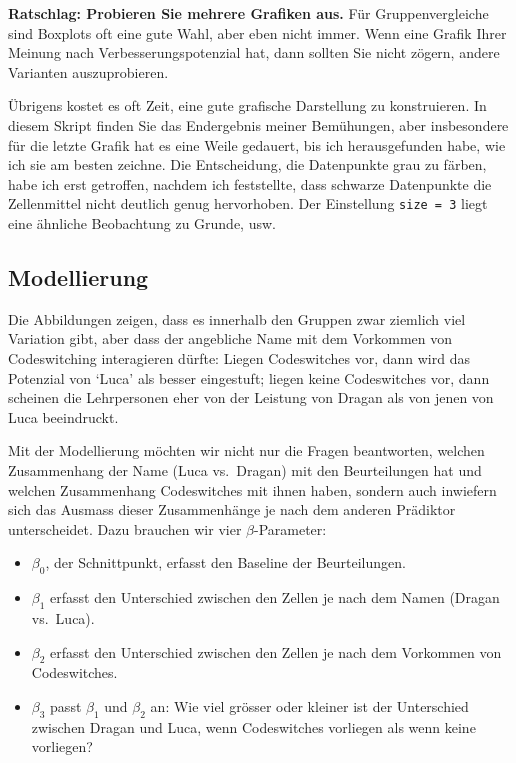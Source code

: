 \documentclass[oneside, 10pt]{book}\usepackage[]{graphicx}\usepackage[]{xcolor}
\begin{document}
\medskip

\begin{framed}
\noindent \textbf{Ratschlag: Probieren Sie mehrere Grafiken aus.} Für
Gruppenvergleiche sind Boxplots oft eine gute Wahl,
aber eben nicht immer. Wenn eine Grafik Ihrer Meinung
nach Verbesserungspotenzial hat, dann sollten Sie nicht
zögern, andere Varianten auszuprobieren.

Übrigens kostet es oft Zeit, eine gute grafische
Darstellung zu konstruieren. In diesem Skript finden
Sie das Endergebnis meiner Bemühungen, aber
insbesondere für die letzte Grafik hat es eine Weile
gedauert, bis ich herausgefunden habe, wie ich sie
am besten zeichne. Die Entscheidung, die Datenpunkte
grau zu färben, habe ich erst getroffen, nachdem ich
feststellte, dass schwarze Datenpunkte die Zellenmittel
nicht deutlich genug hervorhoben. 
Der Einstellung \texttt{size = 3} liegt eine ähnliche 
Beobachtung zu Grunde, usw.
\end{framed}

\subsection{Modellierung}
Die Abbildungen zeigen, dass es innerhalb den Gruppen zwar
ziemlich viel Variation gibt, aber dass der angebliche
Name mit dem Vorkommen von Codeswitching interagieren dürfte:
Liegen Codeswitches vor, dann wird das Potenzial von `Luca'
als besser eingestuft; liegen keine Codeswitches vor,
dann scheinen die Lehrpersonen eher von der Leistung von
Dragan als von jenen von Luca beeindruckt.

Mit der Modellierung möchten wir nicht nur die Fragen beantworten,
welchen Zusammenhang der Name (Luca vs.\ Dragan) mit den Beurteilungen
hat und welchen Zusammenhang Codeswitches mit ihnen haben, sondern auch
inwiefern sich das Ausmass dieser Zusammenhänge je nach dem anderen Prädiktor
unterscheidet. Dazu brauchen wir vier $\beta$-Parameter:
\begin{itemize}
 \item $\beta_0$, der Schnittpunkt, erfasst den Baseline der Beurteilungen.
 \item $\beta_1$ erfasst den Unterschied zwischen den Zellen je nach dem Namen (Dragan vs.\ Luca).
 \item $\beta_2$ erfasst den Unterschied zwischen den Zellen je nach dem Vorkommen von Codeswitches.
 \item $\beta_3$ passt $\beta_1$ und $\beta_2$ an: Wie viel grösser oder kleiner ist der Unterschied
 zwischen Dragan und Luca, wenn Codeswitches vorliegen als wenn keine vorliegen?
\end{itemize}
\end{document}
